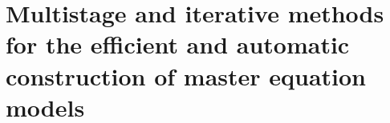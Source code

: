 \chapter{Multistage and iterative methods for the efficient and automatic construction of master equation models}
\label{chapter:automatic-construction-of-master-equation}
 